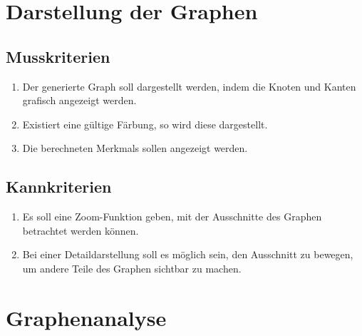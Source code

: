 \documentclass[13pt]{scrreprt}
\newcounter{tempcounter1}
\newcounter{tempcounter2}
\newcounter{tempcounter3}
\newcounter{tempcounter4}
\newcounter{tempcounter5}
\newcounter{tempcounter6}
\newcounter{tempcounter7}
\newcounter{tempcounter8}
\newcounter{tempcounter9}
\begin{document}
\section{Darstellung der Graphen}
\subsection{Musskriterien}
\begin{addmargin}[25pt]{0pt}
\begin{enumerate} [label=FA\arabic*,start=500]
	\item \label{FA500}Der generierte Graph soll dargestellt werden, indem die Knoten und Kanten grafisch angezeigt werden.
	\item Existiert eine gültige Färbung, so wird diese dargestellt.
	\item Die berechneten \Glspl{Merkmal} sollen angezeigt werden.
\setcounter{tempcounter7}{\value{enumi}}
\end{enumerate}
\end{addmargin}
\addtocounter{tempcounter7}{1}
\subsection{Kannkriterien}
\begin{addmargin}[25pt]{0pt}
\begin{enumerate} [label=FA\arabic*,start=\value{tempcounter7}]
	\item \label{FA503}Es soll eine Zoom-Funktion geben, mit der Ausschnitte des Graphen betrachtet werden können. 
	\item \label{FA504}Bei einer Detaildarstellung soll es möglich sein, den Ausschnitt zu bewegen, um andere Teile des Graphen sichtbar zu machen.
\end{enumerate}
\end{addmargin}

\newpage
\section{Graphenanalyse}
\label{Graphenanalyse}
\end{document}
